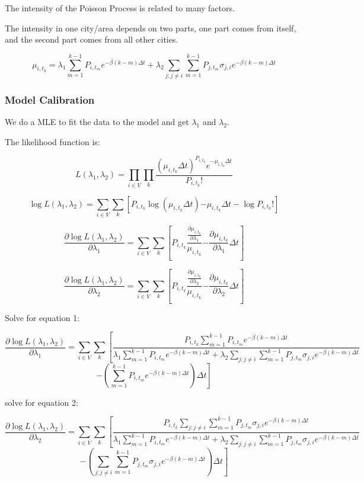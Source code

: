 \documentclass[12pt]{article}
\begin{document}
The intensity of the Poisson Process is related to many factors. 

The intensity in one city/area depends on two parts, one part comes from itself, and the second part comes from all other cities. 




$$\mu_{i,t_k} = \lambda_1 \sum_{m = 1}^{ k-1} P_{i,t_m} e^{-\beta(k-m)\Delta t} + \lambda_2 \sum_{j:j\neq i} \sum_{m = 1}^{ k-1} P_{j,t_m} \sigma_{j,i} e^{-\beta(k-m)\Delta t }$$

\subsubsection{Model Calibration}

We do a MLE to fit the data to the model and get $\lambda_1$ and $\lambda_2$.

The likelihood function is:

$$L(\lambda_1, \lambda_2) = \prod_{i \in V} \prod_{k} \frac{(\mu_{i,t_k}\Delta t)^{P_{i,t_k}} e^{-\mu_{i,t_k}\Delta t}}{P_{i,t_k}!}
$$


$$
\log L(\lambda_1, \lambda_2) = \sum_{i \in V} \sum_{k}\left[ {P_{i,t_k} \log{(\mu_{i,t_k}\Delta t)} {-\mu_{i,t_k}\Delta t}} - \log{P_{i,t_k}!} \right]
$$


$$
\frac{\partial \log L(\lambda_1, \lambda_2)}{\partial \lambda_1} = \sum_{i \in V} \sum_{k}\left[ {P_{i,t_k} \frac{ \frac{\partial \mu_{i,t_k}}{\partial \lambda_1}}{\mu_{i,t_k}} {- \frac{\partial \mu_{i,t_k}}{\partial \lambda_1}\Delta t}} \right] 
$$


$$
\frac{\partial \log L(\lambda_1, \lambda_2)}{\partial \lambda_2} = \sum_{i \in V} \sum_{k}\left[ {P_{i,t_k} \frac{ \frac{\partial \mu_{i,t_k}}{\partial \lambda_2}}{\mu_{i,t_k}} {- \frac{\partial \mu_{i,t_k}}{\partial \lambda_2}\Delta t}} \right] 
$$

Solve for equation 1:

$$
\frac{\partial \log L(\lambda_1, \lambda_2)}{\partial \lambda_1} = \sum_{i \in V} \sum_{k}\left[ { \frac{P_{i,t_k}\sum_{m = 1}^{ k-1} P_{i,t_m} e^{-\beta(k-m)\Delta t}}{ \lambda_1 \sum_{m = 1}^{ k-1} P_{i,t_m} e^{-\beta(k-m)\Delta t} + \lambda_2 \sum_{j:j\neq i} \sum_{m = 1}^{ k-1} P_{j,t_m} \sigma_{j,i} e^{-\beta(k-m)\Delta t}}} \right.
$$
$$
\left. {- \left( \sum_{m = 1}^{ k-1} P_{i,t_m} e^{-\beta(k-m)\Delta t} \right)\Delta t} \right] 
$$

solve for equation 2:

$$
\frac{\partial \log L(\lambda_1, \lambda_2)}{\partial \lambda_2} = \sum_{i \in V} \sum_{k}\left[ { \frac{P_{i,t_k}\sum_{j:j\neq i} \sum_{m = 1}^{ k-1} P_{j,t_m} \sigma_{j,i} e^{-\beta(k-m)\Delta t} }{ \lambda_1 \sum_{m = 1}^{ k-1} P_{i,t_m} e^{-\beta(k-m)\Delta t} + \lambda_2 \sum_{j:j\neq i} \sum_{m = 1}^{ k-1} P_{j,t_m} \sigma_{j,i} e^{-\beta(k-m)\Delta t}}} \right.
$$
$$
\left. {- \left( \sum_{j:j\neq i} \sum_{m = 1}^{ k-1} P_{j,t_m} \sigma_{j,i} e^{-\beta(k-m)\Delta t} \right)\Delta t} \right] 
$$
\end{document}

